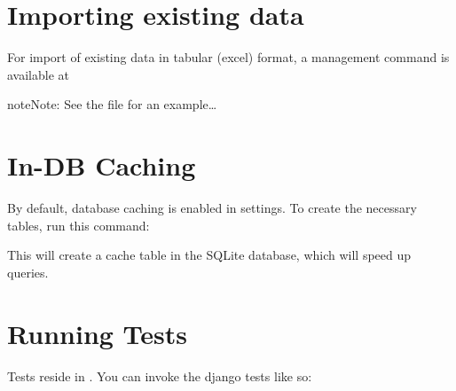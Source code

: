 \documentclass[letterpaper,10pt,openany,oneside,english]{sphinxmanual}
\begin{document}
\noindent{}


\section{Importing existing data}
\label{\detokenize{index:importing-existing-data}}
For import of existing data in tabular (excel) format, a management command is available at

%
\begin{sphinxVerbatim}[commandchars=\\\{\}]
  
\end{sphinxVerbatim}

\begin{sphinxadmonition}{note}{Note:}
See the file  for an example…
\end{sphinxadmonition}

\noindent{}


\section{In-DB Caching}
\label{\detokenize{index:in-db-caching}}
By default, database caching is enabled in settings. To create the necessary tables, run this
command:

%
\begin{sphinxVerbatim}[commandchars=\\\{\}]
  
\end{sphinxVerbatim}

This will create a cache table in the SQLite database, which will speed up queries.


\section{Running Tests}
\label{\detokenize{index:running-tests}}
Tests reside in .
You can invoke the django tests like so:

%
\begin{sphinxVerbatim}[commandchars=\\\{\}]
  
\end{sphinxVerbatim}
\end{document}
